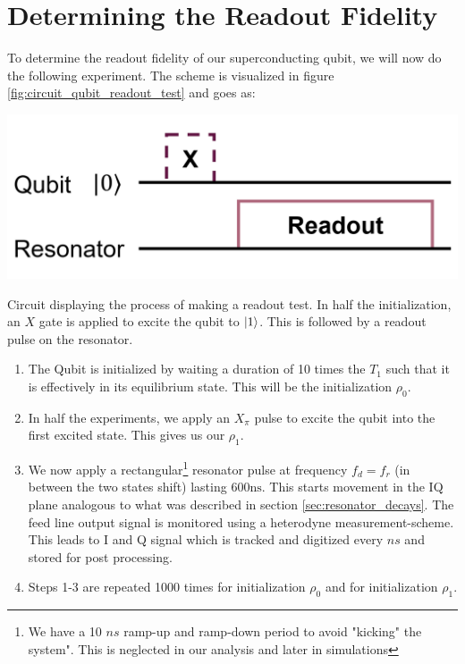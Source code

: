 \section{Determining the Readout Fidelity}
To determine the readout fidelity of our superconducting qubit, we will now do the following experiment.  The scheme is visualized in figure \ref{fig:circuit_qubit_readout_test} and goes as:
\begin{marginfigure}
    \centering
    \includegraphics[]{Figs/circuits/readout_test.png}
    \caption{Circuit displaying the process of making a readout test. In half the initialization, an $X$ gate is applied to excite the qubit to $\ket{1}$. This is followed by a readout pulse on the resonator.}
    \label{fig:circuit_qubit_readout_test}
\end{marginfigure}
\begin{enumerate}
    \item The Qubit is initialized by waiting a duration of 10 times the $T_1$ such that it is effectively in its equilibrium state. This will be the initialization $\rho_0$.
    \item In half the experiments, we apply an $X_\pi$ pulse to excite the qubit into the first excited state. This gives us our $\rho_1$.
    \item We now apply a rectangular\footnote{We have a 10 $ns$ ramp-up and ramp-down period to avoid "kicking" the system". This is neglected in our analysis and later in simulations} resonator pulse at frequency $f_d = f_r$ (in between the two states shift) lasting $600 \text{ns}$. This starts movement in the IQ plane  analogous to what was described in section \ref{sec:resonator_decays}. The feed line output signal is monitored using a heterodyne measurement-scheme. This leads to I and Q signal which is tracked and digitized every $ns$ and stored for post processing.
    \item Steps 1-3 are repeated 1000 times for initialization $\rho_0$ and for initialization $\rho_1$.
\end{enumerate}
